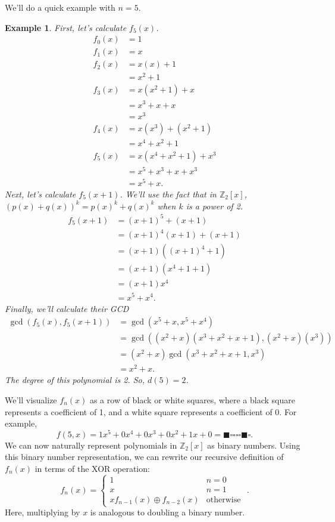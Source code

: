\documentclass[a4paper]{article}
\newtheorem{example}{Example}
\newcommand{\Z}{\mathbb{Z}}
\newcommand{\xor}{\oplus}
\begin{document}
	We'll do a quick example with $n=5$.
	\begin{example}
		First, let's calculate $f_5(x)$.
		\begin{align*}
			f_0(x) &= 1 \\
			f_1(x) &= x \\
			f_2(x) &= x(x) + 1 \\
				&= x^2 + 1 \\
			f_3(x) &= x(x^2 + 1) + x \\
				&= x^3 + x + x \\
				&= x^3 \\
			f_4(x) &= x(x^3) + (x^2 + 1) \\
				&= x^4 + x^2 + 1 \\
			f_5(x) &= x\left(x^4 + x^2 + 1\right) + x^3 \\
				&= x^5 + x^3 + x + x^3 \\
				&= x^5 + x.
		\end{align*}
		Next, let's calculate $f_5(x+1)$.
		We'll use the fact that in $\Z_2[x]$, $(p(x) + q(x))^k = p(x)^k + q(x)^k$ when $k$ is a power of 2.
		\begin{align*}
			f_5(x+1) &= (x+1)^5 + (x+1) \\
			&= (x+1)^4(x+1) + (x+1) \\
			&= (x+1)((x+1)^4 + 1) \\
			&= (x+1)(x^4 + 1 + 1) \\
			&= (x+1)x^4 \\
			&= x^5 + x^4.
		\end{align*}
		Finally, we'll calculate their GCD
		\begin{align*}
			\gcd{\left(f_5(x), f_5(x+1)\right)} &= \gcd{\left(x^5 + x, x^5 + x^4\right)} \\
			&= \gcd{\left((x^2+x)(x^3 + x^2 + x + 1), (x^2+x)(x^3)\right)} \\
			&= (x^2+x)\gcd{\left(x^3 + x^2 + x + 1, x^3\right)} \\
			&= x^2 + x.
		\end{align*}
		The degree of this polynomial is 2.
		So, $d(5) = 2$.
	\end{example}

	We'll visualize $f_n(x)$ as a row of black or white squares, where a black square represents a coefficient of 1, and a white square represents a coefficient of 0.
	For example,
	\begin{equation*}
		f(5,x) = 1x^5 + 0x^4 + 0x^3 + 0x^2 + 1x + 0 = \blacksquare\square\square\square\square\blacksquare\square.
	\end{equation*}
	We can now naturally represent polynomials in $\Z_2[x]$ as binary numbers.
	Using this binary number representation, we can rewrite our recursive definition of $f_n(x)$ in terms of the XOR operation:
	\begin{equation*}
		f_n(x) = \begin{cases}
			1 & n=0 \\
			x & n=1 \\
			xf_{n-1}(x) \xor f_{n-2}(x) & \text{otherwise }
		\end{cases}.
	\end{equation*}
	Here, multiplying by $x$ is analogous to doubling a binary number.
	
\end{document}
